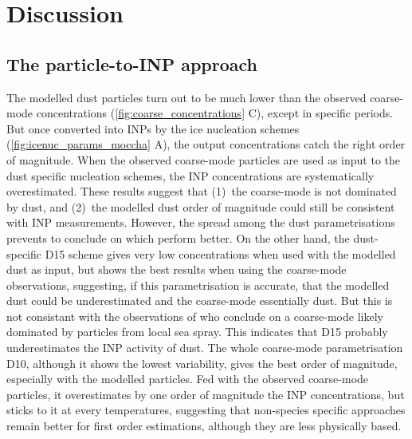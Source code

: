         

\section{Discussion}
\label{sec:discussion_chap4}
\subsection{The particle-to-INP approach}
\label{sec:particle_to_INP}
    The modelled dust particles turn out to be much lower than the observed coarse-mode concentrations (\cref{fig:coarse_concentrations} C), except in specific periods. But once converted into INPs by the ice nucleation schemes (\cref{fig:icenuc_params_moccha} A), the output concentrations catch the right order of magnitude.
    When the observed coarse-mode particles are used as input to the dust specific nucleation schemes, the INP concentrations are systematically overestimated.
    These results suggest that (1)~the coarse-mode is not dominated by dust, and (2)~the modelled dust order of magnitude could still be consistent with INP measurements. However, the spread among the dust parametrisations prevents to conclude on which perform better.
    On the other hand, the dust-specific D15 scheme gives very low concentrations when used with the modelled dust as input, but shows the best results when using the coarse-mode observations, suggesting, if this parametrisation is accurate, that the modelled dust could be underestimated and the coarse-mode essentially dust. But this is not consistant with the observations of \citet{kojoj_arctic_2024} who conclude on a coarse-mode likely dominated by particles from local sea spray. This indicates that D15 probably underestimates the INP activity of dust.
    The whole coarse-mode parametrisation D10, although it shows the lowest variability, gives the best order of magnitude, especially with the modelled particles. Fed with the observed coarse-mode particles, it overestimates by one order of magnitude the INP concentrations, but sticks to it at every temperatures, suggesting that non-species specific approaches remain better for first order estimations, although they are less physically based.

